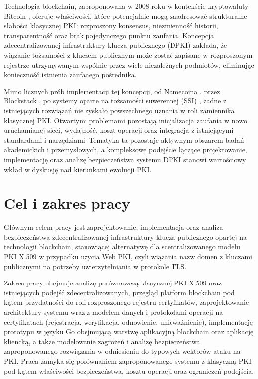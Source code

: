 Technologia blockchain, zaproponowana w 2008 roku w kontekście kryptowaluty Bitcoin \cite{nakamoto2008bitcoin}, oferuje właściwości, które potencjalnie mogą zaadresować strukturalne słabości klasycznej PKI: rozproszony konsensus, niezmienność historii, transparentność oraz brak pojedynczego punktu zaufania. Koncepcja zdecentralizowanej infrastruktury klucza publicznego (DPKI) \cite{allen2015dpki} zakłada, że wiązanie tożsamości z kluczem publicznym może zostać zapisane w rozproszonym rejestrze utrzymywanym wspólnie przez wiele niezależnych podmiotów, eliminując konieczność istnienia zaufanego pośrednika.

Mimo licznych prób implementacji tej koncepcji, od Namecoina \cite{kalodner2015namecoin}, przez Blockstack \cite{ali2016blockstack}, po systemy oparte na tożsamości suwerennej (SSI) \cite{w3c-did-core}, żadne z istniejących rozwiązań nie zyskało powszechnego uznania w roli zamiennika klasycznej PKI. Otwartymi problemami pozostają inicjalizacja zaufania w nowo uruchamianej sieci, wydajność, koszt operacji oraz integracja z istniejącymi standardami i narzędziami. Tematyka ta pozostaje aktywnym obszarem badań akademickich i przemysłowych, a kompleksowe podejście łączące projektowanie, implementację oraz analizę bezpieczeństwa systemu DPKI stanowi wartościowy wkład w dyskusję nad kierunkami ewolucji PKI.

\section{Cel i zakres pracy}
\label{sec:cel-zakres}

Głównym celem pracy jest zaprojektowanie, implementacja oraz analiza bezpieczeństwa zdecentralizowanej infrastruktury klucza publicznego opartej na technologii blockchain, stanowiącej alternatywę dla scentralizowanego modelu PKI X.509 w przypadku użycia Web PKI, czyli wiązania nazw domen z kluczami publicznymi na potrzeby uwierzytelniania w protokole TLS.

Zakres pracy obejmuje analizę porównawczą klasycznej PKI X.509 oraz istniejących podejść zdecentralizowanych, przegląd platform blockchain pod kątem przydatności do roli rozproszonego rejestru certyfikatów, zaprojektowanie architektury systemu wraz z modelem danych i protokołami operacji na certyfikatach (rejestracja, weryfikacja, odnowienie, unieważnienie), implementację prototypu w języku Go obejmującą warstwę aplikacyjną blockchain oraz aplikację kliencką, a także modelowanie zagrożeń i analizę bezpieczeństwa zaproponowanego rozwiązania w odniesieniu do typowych wektorów ataku na PKI. Praca zamyka się porównaniem zaproponowanego systemu z klasyczną PKI pod kątem właściwości bezpieczeństwa, kosztu operacji oraz ograniczeń podejścia.

